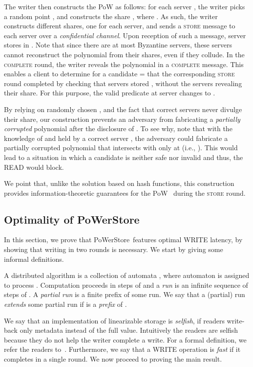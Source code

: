 \documentclass[10pt,conference,compsocconf]{IEEEtran}
\newcommand{\protocol}{PoWerStore}
\newcommand{\complete}{\textsc{complete}}
\begin{document}
The writer then constructs the PoW as follows: for each server , the writer picks a random point , and constructs the share , where . As such, the writer constructs  different shares, one for each server, and sends a \textsc{store} message to each server  over a \emph{confidential channel}.
Upon reception of such a message, server  stores  in . Note that since there are at most  Byzantine servers, these servers cannot reconstruct the polynomial  from their shares, even if they collude. In the \textsc{\complete} round, the writer reveals the polynomial  in a \textsc{\complete} message. This enables a client to determine for a candidate  =  that the corresponding \textsc{store} round completed by checking that  servers  stored , without the servers revealing their share. For this purpose, the \textsf{valid} predicate at server  changes to .



By relying on randomly chosen , and the fact that correct servers never divulge their share, our construction prevents an adversary from fabricating a \emph{partially corrupted} polynomial after the disclosure of . To see why, note that with the knowledge of  and  held by a correct server , the adversary could fabricate a partially corrupted polynomial  that intersects with  only at  (i.e., ). This would lead to a situation in which a candidate  is neither \textsf{safe} nor \textsf{invalid} and thus, the \textsc{READ} would block.

We point that, unlike the solution based on hash functions, this construction provides information-theoretic guarantees for the PoW~\cite{LCAA07,AAB07} during the \textsc{store} round.


\subsection{Optimality of \protocol{}}
In this section, we prove that \protocol\ features optimal \textsc{WRITE} latency, by showing that writing in two rounds is necessary. We start by giving some informal definitions.

A distributed algorithm  is a collection of automata \cite{LT89}, where automaton  is assigned to process . Computation proceeds in steps of  and a \emph{run} is an infinite sequence of steps of . A \emph{partial run} is a finite prefix of some run. We say that a (partial) run  \emph{extends} some partial run  if  is a \emph{prefix} of .

We say that an implementation of linearizable storage is \emph{selfish}, if readers write-back only metadata instead of the full value. Intuitively the readers are selfish because they do not help the writer complete a write. For a formal definition, we refer the readers to~\cite{FL03}. Furthermore, we say that a \textsc{WRITE} operation is \emph{fast} if it completes in a single round. We now proceed to proving the main result. 
\end{document}
